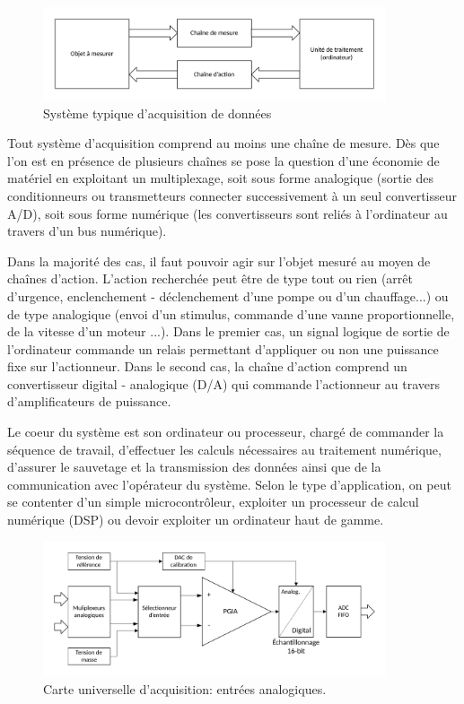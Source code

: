 \documentclass[main.tex]{subfiles}
\begin{document}
\begin{figure}[h]
    \centering
    \includegraphics[width=0.9\textwidth]{assets/figures/acquisition-de-donnees.pdf}
    \caption{Système typique d'acquisition de données}
    \label{fig:SystemeTypiquedAcquisitionDeDonnees}
\end{figure}

Tout système d'acquisition comprend au moins une chaîne de mesure. Dès que l'on est en présence de plusieurs chaînes se pose la question d'une économie de matériel en exploitant un multiplexage, soit sous forme analogique (sortie des conditionneurs ou transmetteurs connecter successivement à un seul convertisseur A/D), soit sous forme numérique (les convertisseurs sont reliés à l'ordinateur au travers d'un bus numérique).

Dans la majorité des cas, il faut pouvoir agir sur l'objet mesuré au moyen de chaînes d'action. L'action recherchée peut être de type tout ou rien (arrêt d'urgence, enclenchement - déclenchement d'une pompe ou d'un chauffage...) ou de type analogique (envoi d'un stimulus, commande d'une vanne proportionnelle, de la vitesse d'un moteur ...). Dans le premier cas, un signal logique de sortie de l'ordinateur commande un relais permettant d'appliquer ou non une puissance fixe sur l'actionneur. Dans le second cas, la chaîne d'action comprend un convertisseur digital - analogique (D/A) qui commande l'actionneur au travers d'amplificateurs de puissance.

Le coeur du système est son ordinateur ou processeur, chargé de commander la séquence de travail, d'effectuer les calculs nécessaires au traitement numérique, d'assurer le sauvetage et la transmission des données ainsi que de la communication avec l'opérateur du système. Selon le type d'application, on peut se contenter d'un simple microcontrôleur, exploiter un processeur de calcul numérique (DSP) ou devoir exploiter un ordinateur haut de gamme.

\begin{figure}[ht]
    \centering
    \includegraphics[width=0.9\textwidth]{assets/figures/entrees-analogiques.pdf}
    \caption{Carte universelle d'acquisition: entrées analogiques.}
    \label{fig:Analog_Frontend}
\end{figure}
\end{document}
